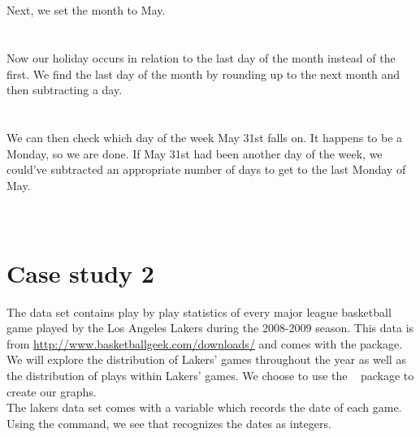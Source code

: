 \documentclass[article]{jss}
\begin{document}
\\
\\

Next, we set the month to May.\\

\\
\\

Now our holiday occurs in relation to the last day of the month instead of the first. We find the last day of the month by rounding up to the next month and then subtracting a day.\\

\\
\\

We can then check which day of the week May 31st falls on. It happens to be a Monday, so we are done. If May 31st had been another day of the week, we could've subtracted an appropriate number of days to get to the last Monday of May.\\

\\
\\


\section{Case study 2}
The  data set contains play by play statistics of every major league basketball game played by the Los Angeles Lakers during the 2008-2009 season. This data is from \url{http://www.basketballgeek.com/downloads/} \citep{bball} and comes with the  package. We will explore the distribution of Lakers' games throughout the year as well as the distribution of plays within Lakers' games. We choose to use the  ~\citep{ggplot2} package to create our graphs.\\

The lakers data set comes with a  variable which records the date of each game. Using the  command, we see that  recognizes the dates as integers.\\

\\
\\
\end{document}
